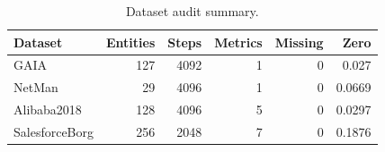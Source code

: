 \begin{table}[t]
\centering
\scriptsize
\caption{Dataset audit summary.}
\label{tab:dataset-audit}
\begin{tabular}{lrrrrr}
\toprule
Dataset & Entities & Steps & Metrics & Missing & Zero \\
\midrule
GAIA & 127 & 4092 & 1 & 0 & 0.027 \\
NetMan & 29 & 4096 & 1 & 0 & 0.0669 \\
Alibaba2018 & 128 & 4096 & 5 & 0 & 0.0297 \\
SalesforceBorg & 256 & 2048 & 7 & 0 & 0.1876 \\
\bottomrule
\end{tabular}
\end{table}
